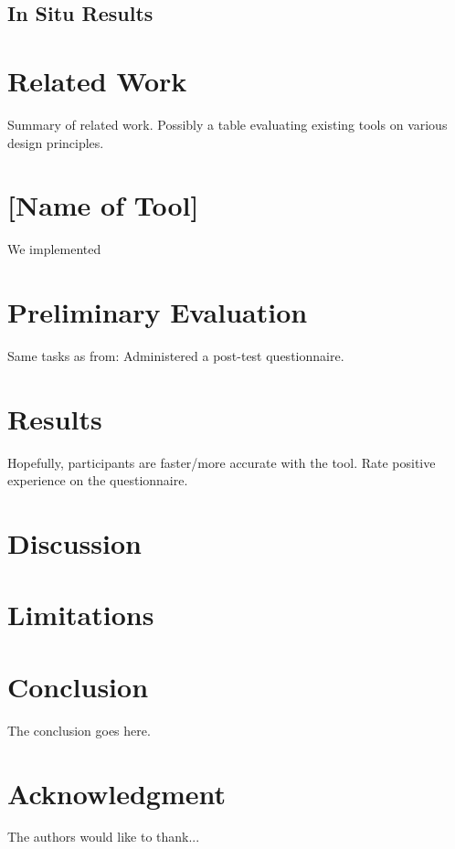 \documentclass[conference]{IEEEtran}
\begin{document}
\subsection{In Situ Results}  


\section{Related Work}
Summary of related work. Possibly a table evaluating existing tools on various design principles.


\section{[Name of Tool]}
We implemented 

\section{Preliminary Evaluation}
Same tasks as from: \cite{Smith2015}
Administered a post-test questionnaire. 

\section{Results}
Hopefully, participants are faster/more accurate with the tool. Rate positive experience on the questionnaire.

\section{Discussion}
\section{Limitations}



\section{Conclusion}
The conclusion goes here.






\section*{Acknowledgment}


The authors would like to thank...
\end{document}
